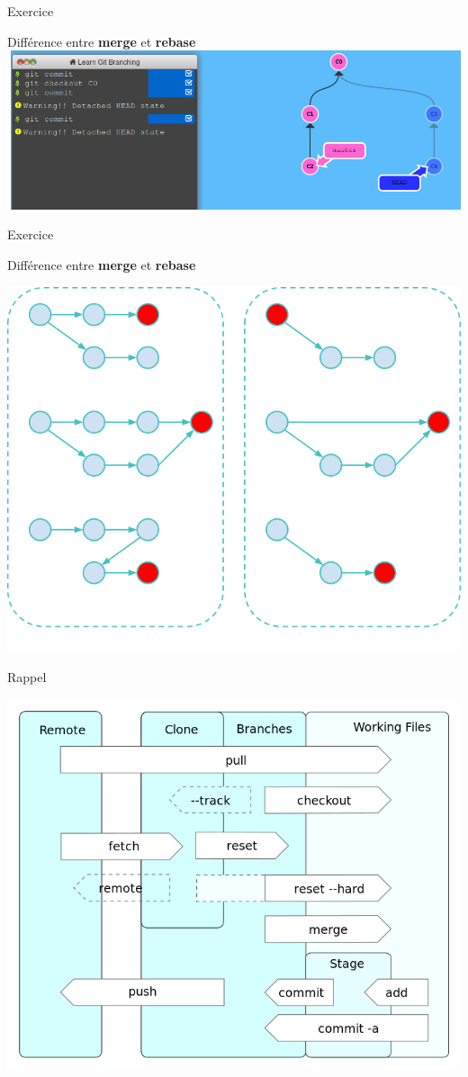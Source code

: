 \documentclass{beamer}
\begin{document}
\begin{frame}[fragile]{Exercice}
  \begin{exampleblock}{Différence entre \textbf{merge} et \textbf{rebase}}
    \includegraphics[width=\linewidth]{images/virtual-repo}
  \end{exampleblock}
\end{frame}

\begin{frame}[fragile]{Exercice}
  \begin{exampleblock}{Différence entre \textbf{merge} et \textbf{rebase}}
    \begin{center}
      \includegraphics[width=0.7\linewidth]{images/merge-rebase}  
    \end{center}
  \end{exampleblock}
\end{frame}


\begin{frame}[fragile]{Rappel}
  \begin{center}
    \includegraphics[width=0.8\linewidth]{images/git-all}
  \end{center}
\end{frame}
\end{document}
